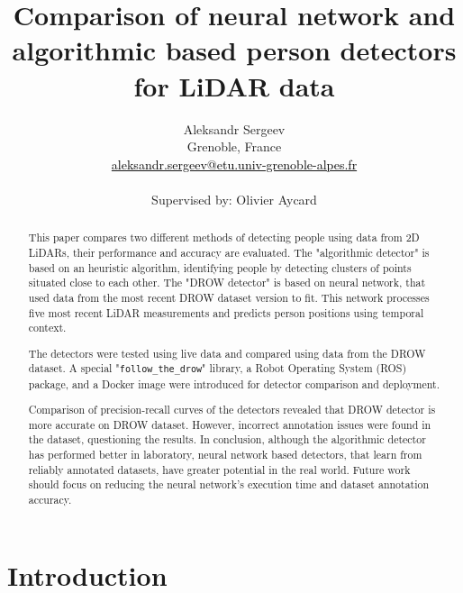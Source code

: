 \documentclass{article}
\title{
    Comparison of neural network and algorithmic based person detectors for LiDAR data
}
\author{
    Aleksandr Sergeev \\ 
    Grenoble, France \\
    \href{mailto:aleksandr.sergeev@etu.univ-grenoble-alpes.fr}{\textcolor{black}{aleksandr.sergeev@etu.univ-grenoble-alpes.fr}} \\
    \\
    Supervised by: Olivier Aycard
}
\begin{document}

\parbox[b]{\linewidth}{}

\begin{abstract}
    This paper compares two different methods of detecting people using data from 2D LiDARs, their performance and accuracy are evaluated.
    The "algorithmic detector" is based on an heuristic algorithm, identifying people by detecting clusters of points situated close to each other.
    The "DROW detector" is based on neural network, that used data from the most recent DROW dataset version to fit.
    This network processes five most recent LiDAR measurements and predicts person positions using temporal context.

    The detectors were tested using live data and compared using data from the DROW dataset.
    A special "\texttt{follow\_the\_drow}" library, a Robot Operating System (ROS) package, and a Docker image were introduced for detector comparison and deployment.

    Comparison of precision-recall curves of the detectors revealed that DROW detector is more accurate on DROW dataset.
    However, incorrect annotation issues were found in the dataset, questioning the results.
    In conclusion, although the algorithmic detector has performed better in laboratory, neural network based detectors, that learn from reliably annotated datasets, have greater potential in the real world.
    Future work should focus on reducing the neural network's execution time and dataset annotation accuracy.
\end{abstract}

\section{Introduction}
\end{document}
